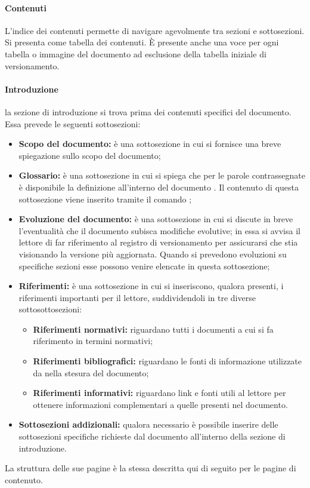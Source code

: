 \paragraph{Contenuti}
L’indice dei contenuti permette di navigare agevolmente tra sezioni e sottosezioni. Si presenta come tabella dei contenuti. È presente anche una voce per ogni tabella o immagine del documento ad esclusione della tabella iniziale di versionamento.

\paragraph{Introduzione} la sezione di introduzione si trova prima dei contenuti specifici del documento. Essa prevede le seguenti sottosezioni:
\begin{itemize}
	\item \textbf{Scopo del documento:} è una sottosezione in cui si fornisce una breve spiegazione sullo scopo del documento;
	\item \textbf{Glossario:} è una sottosezione in cui si spiega che per le parole contrassegnate è disponibile la definizione all'interno del documento \docNameVersionGlo{}. Il contenuto di questa sottosezione viene inserito tramite il comando ;
	\item \textbf{Evoluzione del documento:} è una sottosezione in cui si discute in breve l'eventualità che il documento subisca modifiche evolutive; in essa si avvisa il lettore di far riferimento al registro di versionamento per assicurarsi che stia visionando la versione più aggiornata. Quando si prevedono evoluzioni su specifiche sezioni esse possono venire elencate in questa sottosezione;
	\item \textbf{Riferimenti:} è una sottosezione in cui si inseriscono, qualora presenti, i riferimenti importanti per il lettore, suddividendoli in tre diverse sottosottosezioni:
	\begin{itemize}
		\item \textbf{Riferimenti normativi:} riguardano tutti i documenti  a cui si fa riferimento in termini normativi;
		\item \textbf{Riferimenti bibliografici:} riguardano le fonti di informazione utilizzate da \groupName{} nella stesura del documento;
		\item \textbf{Riferimenti informativi:} riguardano link e fonti utili al lettore per ottenere informazioni complementari a quelle presenti nel documento.
	\end{itemize}
	\item \textbf{Sottosezioni addizionali:} qualora necessario è possibile inserire delle sottosezioni specifiche richieste dal documento all'interno della sezione di introduzione.
\end{itemize}
La struttura delle sue pagine è la stessa descritta qui di seguito per le pagine di contenuto.

